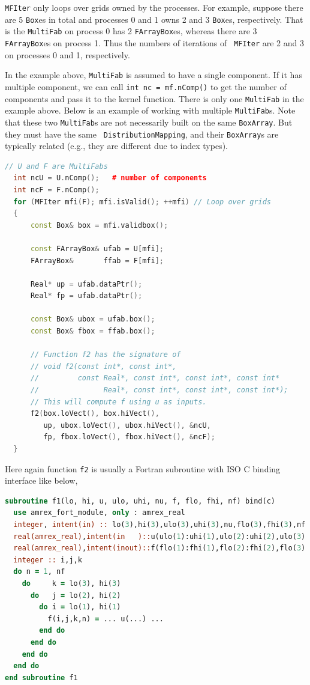 {{{{\tt MFIter} only loops over grids owned by the processes.  For
example, suppose there are 5 {\tt Box}es in total and processes 0 and
1 owns 2 and 3 {\tt Box}es, respectively.  That is the {\tt MultiFab}
on process 0 has 2 {\tt FArrayBox}es, whereas there are 3 {\tt
  FArrayBox}es on process 1.  Thus the numbers of iterations of {\tt
  MFIter} are 2 and 3 on processes 0 and 1, respectively.

In the example above, {\tt MultiFab} is assumed to have a single
component.  If it has multiple component, we can call {\tt int nc =
  mf.nComp()} to get the number of components and pass it to the
kernel function.  There is only one {\tt MultiFab} in the example
above.  Below is an example of working with multiple {\tt MultiFab}s.
Note that these two {\tt MultiFab}s are not necessarily built on the
same {\tt BoxArray}.  But they must have the same {\tt
  DistributionMapping}, and their {\tt BoxArray}s are typically
related (e.g., they are different due to index types).
\begin{lstlisting}[language=cpp]
  // U and F are MultiFabs
  int ncU = U.nComp();   # number of components
  int ncF = F.nComp();
  for (MFIter mfi(F); mfi.isValid(); ++mfi) // Loop over grids
  {
      const Box& box = mfi.validbox();

      const FArrayBox& ufab = U[mfi];
      FArrayBox&       ffab = F[mfi];

      Real* up = ufab.dataPtr();
      Real* fp = ufab.dataPtr();

      const Box& ubox = ufab.box();
      const Box& fbox = ffab.box();

      // Function f2 has the signature of 
      // void f2(const int*, const int*,
      //         const Real*, const int*, const int*, const int*
      //               Real*, const int*, const int*, const int*);
      // This will compute f using u as inputs.
      f2(box.loVect(), box.hiVect(),
         up, ubox.loVect(), ubox.hiVect(), &ncU,
         fp, fbox.loVect(), fbox.hiVect(), &ncF);
  }
\end{lstlisting}
Here again function {\tt f2} is usually a Fortran subroutine with ISO
C binding interface like below,
\begin{lstlisting}[language=fortran]
subroutine f1(lo, hi, u, ulo, uhi, nu, f, flo, fhi, nf) bind(c)
  use amrex_fort_module, only : amrex_real
  integer, intent(in) :: lo(3),hi(3),ulo(3),uhi(3),nu,flo(3),fhi(3),nf
  real(amrex_real),intent(in   )::u(ulo(1):uhi(1),ulo(2):uhi(2),ulo(3):uhi(3),nu)
  real(amrex_real),intent(inout)::f(flo(1):fhi(1),flo(2):fhi(2),flo(3):fhi(3),nf)
  integer :: i,j,k
  do n = 1, nf
    do     k = lo(3), hi(3)
      do   j = lo(2), hi(2)
        do i = lo(1), hi(1)
          f(i,j,k,n) = ... u(...) ...
        end do
      end do
    end do
  end do
end subroutine f1
\end{lstlisting}

}}}
